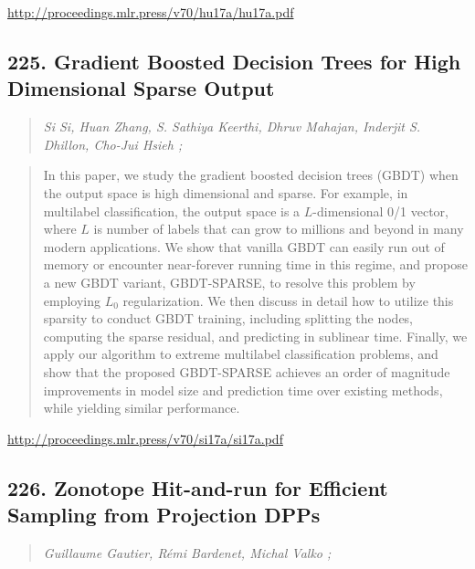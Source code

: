 \documentclass{article}
\begin{document}
\href{http://proceedings.mlr.press/v70/hu17a/hu17a.pdf}{http://proceedings.mlr.press/v70/hu17a/hu17a.pdf}

\subsection{225. Gradient Boosted Decision Trees for High Dimensional Sparse Output}

\begin{quote}
\footnotesize{\textit{Si Si, Huan Zhang, S. Sathiya Keerthi, Dhruv Mahajan, Inderjit S. Dhillon, Cho-Jui Hsieh ;}}
\end{quote}

\begin{quote}
    In this paper, we study the gradient boosted decision trees (GBDT) when the output space is high dimensional and sparse. For example, in multilabel classification, the output space is a $L$-dimensional 0/1 vector, where $L$ is number of labels that can grow to millions and beyond in many modern applications. We show that vanilla GBDT can easily run out of memory or encounter near-forever running time in this regime, and propose a new GBDT variant, GBDT-SPARSE, to resolve this problem by employing $L_0$ regularization. We then discuss in detail how to utilize this sparsity to conduct GBDT training, including splitting the nodes, computing the sparse residual, and predicting in sublinear time. Finally, we apply our algorithm to extreme multilabel classification problems, and show that the proposed GBDT-SPARSE achieves an order of magnitude improvements in model size and prediction time over existing methods, while yielding similar performance.  \end{quote}

\href{http://proceedings.mlr.press/v70/si17a/si17a.pdf}{http://proceedings.mlr.press/v70/si17a/si17a.pdf}

\subsection{226. Zonotope Hit-and-run for Efficient Sampling from Projection DPPs}

\begin{quote}
\footnotesize{\textit{Guillaume Gautier, Rémi Bardenet, Michal Valko ;}}
\end{quote}
\end{document}
